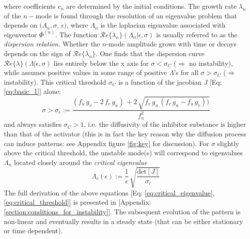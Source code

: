 where coefficients $c_n$ are determined by the initial conditions. The growth rate $\lambda_n$ of the $n-$mode is found through the resolution of an eigenvalue problem that depends on $(\Lambda_n, \sigma$, $\epsilon)$, where $\Lambda_n$ is the laplacian eigenvalue associated with eigenvector $\Phi^{(n)}$. The function $\mathcal{R}e\{\lambda_n\} (\Lambda_n | \epsilon, \sigma)$ is usually referred to as the \textit{dispersion relation}.
Whether the $n$-mode amplitude grows with time or decays depends on the sign of $\mathcal{R}e\{\lambda_n\}$. One finds that the dispersion curve $\mathcal{R}e\{\lambda\}(\Lambda|\epsilon, \sigma)$ lies entirely below the x axis for $\sigma < \sigma_C$ ($\Rightarrow$ no instability), while assumes positive values in some range of positive $\Lambda$'s for all $\sigma > \sigma_C$ ($\Rightarrow$ instability). This critical threshold $\sigma_C$ is a function of the jacobian $J$ [Eq: \ref{eq:basic_1}] alone:
\begin{equation}
 \sigma > \sigma_c :=  \frac{(f_u\,g_v - 2\,f_v\,g_u)\, + 2\,\sqrt{f_v\,g_u\,(f_v\,g_u-f_u\,g_v))}}{f_u^2}
 \label{eq:critical_threshold}
\end{equation}
and always satisfies $\sigma_C > 1$, i.e. the diffusivity of the inhibitor substance is higher than that of the activator (this is in fact the key reason why the diffusion process can induce patterns: see Appendix figure \ref{fig:key} for discussion). \newline \noindent
For $\sigma$ slightly above the critical threshold, the unstable mode(s) will correspond to eigenvalues $\Lambda_n$ located closely around the \textit{critical eigenvalue}
\begin{equation}
    \Lambda_c(\epsilon) := \frac{1}{\epsilon}\,\sqrt{\frac{\text{det}[J]}{\sigma_c}}
    \label{eq:critical_eigenvalue}
\end{equation}
The full derivation of the above equations [Eq: \ref{eq:critical_eigenvalue}, \ref{eq:critical_threshold}] is presented in [Appendix: \ref{section:conditions_for_instability}].
The subsequent evolution of the pattern is non-linear and eventually results in a steady state (that can be either stationary or time dependent).  \bigskip \newline \noindent

